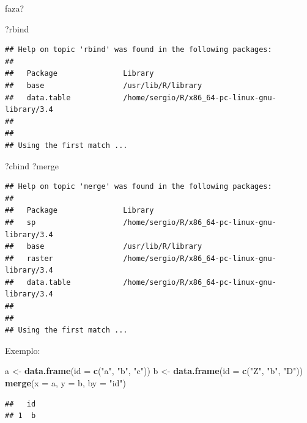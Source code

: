 \documentclass[]{book}
\newenvironment{Shaded}{\begin{snugshade}}{\end{snugshade}}
\newcommand{\KeywordTok}[1]{\textcolor[rgb]{0.13,0.29,0.53}{\textbf{#1}}}
\newcommand{\DataTypeTok}[1]{\textcolor[rgb]{0.13,0.29,0.53}{#1}}
\newcommand{\StringTok}[1]{\textcolor[rgb]{0.31,0.60,0.02}{#1}}
\newcommand{\NormalTok}[1]{#1}
\theoremstyle{definition}
\theoremstyle{definition}
\theoremstyle{definition}
\theoremstyle{remark}
\begin{document}
faza?

\begin{Shaded}
\begin{Highlighting}[]
\NormalTok{?rbind}
\end{Highlighting}
\end{Shaded}

\begin{verbatim}
## Help on topic 'rbind' was found in the following packages:
## 
##   Package               Library
##   base                  /usr/lib/R/library
##   data.table            /home/sergio/R/x86_64-pc-linux-gnu-library/3.4
## 
## 
## Using the first match ...
\end{verbatim}

\begin{Shaded}
\begin{Highlighting}[]
\NormalTok{?cbind}
\NormalTok{?merge}
\end{Highlighting}
\end{Shaded}

\begin{verbatim}
## Help on topic 'merge' was found in the following packages:
## 
##   Package               Library
##   sp                    /home/sergio/R/x86_64-pc-linux-gnu-library/3.4
##   base                  /usr/lib/R/library
##   raster                /home/sergio/R/x86_64-pc-linux-gnu-library/3.4
##   data.table            /home/sergio/R/x86_64-pc-linux-gnu-library/3.4
## 
## 
## Using the first match ...
\end{verbatim}

Exemplo:

\begin{Shaded}
\begin{Highlighting}[]
\NormalTok{a <-}\StringTok{ }\KeywordTok{data.frame}\NormalTok{(}\DataTypeTok{id =} \KeywordTok{c}\NormalTok{(}\StringTok{"a"}\NormalTok{, }\StringTok{"b"}\NormalTok{, }\StringTok{"c"}\NormalTok{))}
\NormalTok{b <-}\StringTok{ }\KeywordTok{data.frame}\NormalTok{(}\DataTypeTok{id =} \KeywordTok{c}\NormalTok{(}\StringTok{"Z"}\NormalTok{, }\StringTok{"b"}\NormalTok{, }\StringTok{"D"}\NormalTok{))}
\KeywordTok{merge}\NormalTok{(}\DataTypeTok{x =}\NormalTok{ a, }\DataTypeTok{y =}\NormalTok{ b, }\DataTypeTok{by =} \StringTok{"id"}\NormalTok{)}
\end{Highlighting}
\end{Shaded}

\begin{verbatim}
##   id
## 1  b
\end{verbatim}
\end{document}
